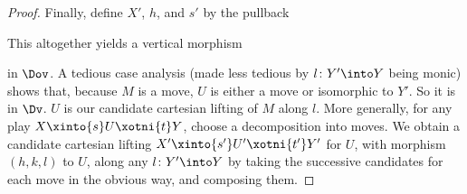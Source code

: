 \documentclass{LMCS}
\theoremstyle{plain}\newtheorem{satz}[thm]{Satz}
\begin{document}
\begin{proof}
  Finally, define $X'$, $h$, and $s'$ by the pullback
  \begin{center}
  \end{center}
  This altogether yields a vertical morphism
  \begin{center}
  \end{center}
  in $\Dov$. A tedious case analysis (made less tedious by $l \colon
  Y' \into Y$ being monic) shows that, because $M$ is a move, $U$ is
  either a move or isomorphic to $Y'$.  So it is in $\Dv$. $U$ is our
  candidate cartesian lifting of $M$ along $l$. More generally, for
  any play $X \xinto{s} U \xotni{t} Y$, choose a decomposition into
  moves. We obtain a candidate cartesian lifting $X' \xinto{s'} U'
  \xotni{t'} Y'$ for $U$, with morphism $(h,k,l)$ to $U$, along any $l
  \colon Y' \into Y$ by taking the successive candidates for each move
  in the obvious way, and composing them.


\end{proof}
\end{document}

